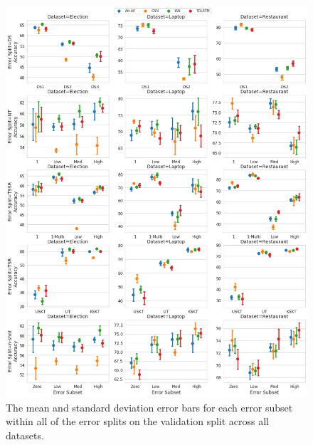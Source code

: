 \begin{figure}
    \centering
    \includegraphics[scale=0.3]{images/augmentation/methods_performance/baseline/validation_error_subsets.png}
    \caption{The mean and standard deviation error bars for each error subset within all of the error splits on the validation split across all datasets.}
    \label{fig:aug_baseline_validation_error_subset}
\end{figure}

